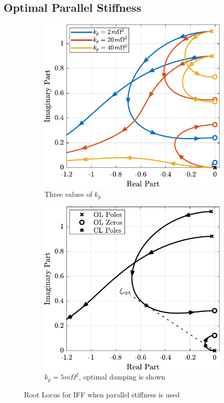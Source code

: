 \documentclass{ISMA_USD2020}
\begin{document}
\subsection{Optimal Parallel Stiffness}
\label{sec:orgb14b5c2}
\begin{figure}[htbp]
\begin{subfigure}[c]{0.49\linewidth}
\includegraphics[width=\linewidth]{figs/root_locus_iff_kps.pdf}
\caption{\label{fig:root_locus_iff_kps} Three values of \(k_p\)}
\end{subfigure}
\begin{subfigure}[c]{0.49\linewidth}
\includegraphics[width=\linewidth]{figs/root_locus_opt_gain_iff_kp.pdf}
\caption{\label{fig:root_locus_opt_gain_iff_kp} \(k_p = 5 m \Omega^2\), optimal damping is shown}
\end{subfigure}
\caption{\label{fig:root_locus_iff_kps_opt}Root Locus for IFF when parallel stiffness is used}
\centering
\end{figure}
\end{document}
